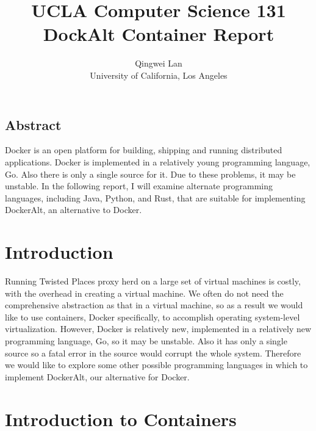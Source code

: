 \documentclass[letterpaper,twocolumn,10pt]{article}
\begin{document}
\date{}

\title{\Large \bf UCLA Computer Science 131 DockAlt Container Report}

\author{
{\rm Qingwei Lan}\\
University of California, Los Angeles
} %

\maketitle

\thispagestyle{empty}


\subsection*{Abstract}

Docker is an open platform for building, shipping and running distributed applications. Docker is implemented in a relatively young programming language, Go. Also there is only a single source for it. Due to these problems, it may be unstable. In the following report, I will examine alternate programming languages, including Java, Python, and Rust, that are suitable for implementing DockerAlt, an alternative to Docker.

\section{Introduction}

Running Twisted Places proxy herd on a large set of virtual machines is costly, with the overhead in creating a virtual machine. We often do not need the comprehensive abstraction as that in a virtual machine, so as a result we would like to use containers, Docker specifically, to accomplish operating system-level virtualization. However, Docker is relatively new, implemented in a relatively new programming language, Go, so it may be unstable. Also it has only a single source so a fatal error in the source would corrupt the whole system. Therefore we would like to explore some other possible programming languages in which to implement DockerAlt, our alternative for Docker.

\section{Introduction to Containers}
\end{document}
